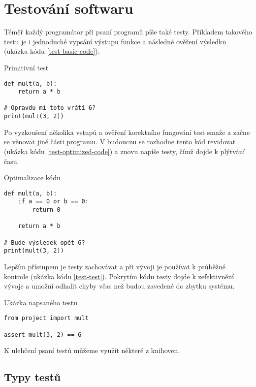\section{Testování softwaru}

Téměř každý programátor při psaní programů píše také testy.
Příkladem takového testu je i jednoduché vypsání výstupu funkce a následné ověření výsledku (ukázka kódu \ref{test-basic-code}).

\begin{listing}[ht]
\caption{\label{test-basic-code}Primitivní test}
\begin{verbatim}
def mult(a, b):
    return a * b

# Opravdu mi toto vrátí 6?
print(mult(3, 2))
\end{verbatim}
\end{listing}

Po vyzkoušení několika vstupů a ověření korektního fungování test smaže a začne se věnovat jiné části programu.
V budoucnu se rozhodne tento kód revidovat (ukázka kódu \ref{test-optimized-code}) a znovu napíše testy, čímž dojde k plýtvání času.

\begin{listing}[ht]
\caption{\label{test-optimized-code}Optimalizace kódu}
\begin{verbatim}
def mult(a, b):
    if a == 0 or b == 0:
        return 0

    return a * b

# Bude výsledek opět 6?
print(mult(3, 2))
\end{verbatim}
\end{listing}

Lepším přístupem je testy zachovávat a při vývoji je používat k průběžné kontrole (ukázka kódu \ref{test-test}).
Pokrytím kódu testy dojde k zefektivnění vývoje a umožní odhalit chyby včas než budou zavedené do zbytku systému.

\begin{listing}[ht]
\caption{\label{test-test}Ukázka napsaného testu}
\begin{verbatim}
from project import mult

assert mult(3, 2) == 6
\end{verbatim}
\end{listing}

K ulehčení psaní testů můžeme využít některé z knihoven.

\subsection{Typy testů}

